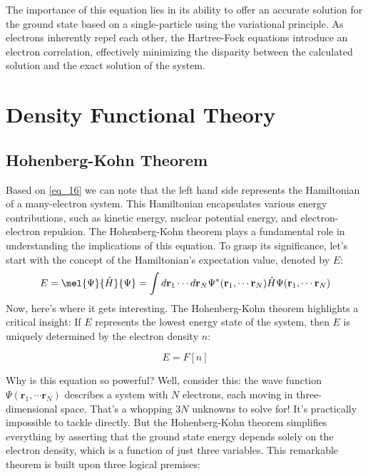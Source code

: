 The importance of this equation lies in its ability to offer an accurate solution for the ground state based on a single-particle using the variational principle. As electrons inherently repel each other, the Hartree-Fock equations introduce an electron correlation, effectively minimizing the disparity between the calculated solution and the exact solution of the system.
\section{Density Functional Theory}
\label{section.DFT}
\subsection{Hohenberg-Kohn Theorem}
\label{subsection.HohenberKohn}
Based on \ref{eq_16} we can note that the left hand side represents the Hamiltonian of a many-electron system. This Hamiltonian encapsulates various energy contributions, such as kinetic energy, nuclear potential energy, and electron-electron repulsion. The Hohenberg-Kohn theorem plays a fundamental role in understanding the implications of this equation. To grasp its significance, let's start with the concept of the Hamiltonian's expectation value, denoted by
$E$:
\begin{equation} \label{eq_32}
    E = \mel{\Psi}{\hat{H}}{\Psi}= \int d\mathbf{r}_1 \cdots d\mathbf{r}_N \Psi^{*}(\mathbf{r}_1, \cdots \mathbf{r}_N) \hat{H} \Psi(\mathbf{r}_1, \cdots \mathbf{r}_N)
\end{equation}
Now, here's where it gets interesting. The Hohenberg-Kohn theorem highlights a critical insight: If $E$ represents the lowest energy state of the system, then 
$E$ is uniquely determined by the electron density $n$:

\begin{equation} \label{eq_33}
    E=F[n]
\end{equation}

Why is this equation so powerful? Well, consider this: the wave function $\Psi(\mathbf{r}_1, \cdots \mathbf{r}_N)$ describes a system with $N$ electrons, each moving in three-dimensional space. That's a whopping $3N$ unknowns to solve for! It's practically impossible to tackle directly. But the Hohenberg-Kohn theorem simplifies everything by asserting that the ground state energy depends solely on the electron density, which is a function of just three variables. This remarkable theorem is built upon three logical premises:

